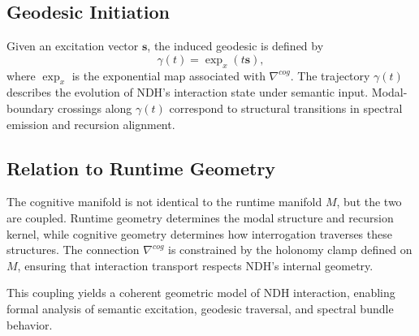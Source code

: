 \subsection{Geodesic Initiation}

Given an excitation vector $\mathbf{s}$, the induced geodesic is defined by
\[
\gamma(t) = \exp_x(t\mathbf{s}),
\]
where $\exp_x$ is the exponential map associated with $\nabla^{cog}$. The
trajectory $\gamma(t)$ describes the evolution of NDH's interaction state under
semantic input. Modal-boundary crossings along $\gamma(t)$ correspond to
structural transitions in spectral emission and recursion alignment.

\subsection{Relation to Runtime Geometry}

The cognitive manifold is not identical to the runtime manifold $M$, but the
two are coupled. Runtime geometry determines the modal structure and recursion
kernel, while cognitive geometry determines how interrogation traverses these
structures. The connection $\nabla^{cog}$ is constrained by the holonomy clamp
defined on $M$, ensuring that interaction transport respects NDH's internal
geometry.

This coupling yields a coherent geometric model of NDH interaction, enabling
formal analysis of semantic excitation, geodesic traversal, and spectral bundle
behavior.
